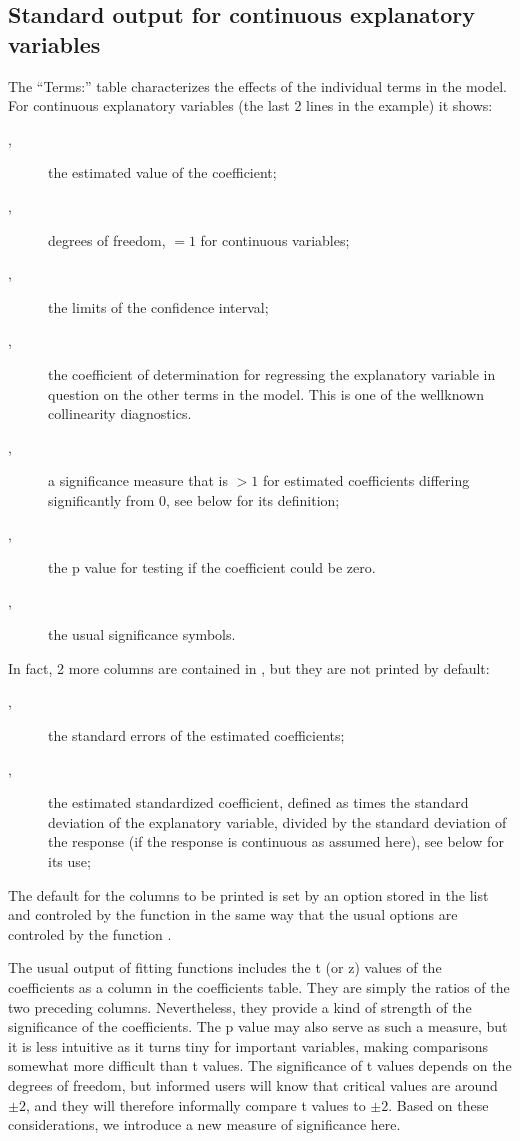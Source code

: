 \documentclass[11pt]{article}
\begin{document}
\subsection{Standard output for continuous explanatory variables}
The ``Terms:'' table characterizes the effects of the individual terms in
the model. For continuous explanatory variables (the last 2 lines in the
example) it shows:
\begin{description}
\item[,] the estimated value of the coefficient;
\item[,] degrees of freedom, $=1$ for continuous variables;
\item[,] the limits of the confidence interval;
\item[,] the coefficient of determination for regressing 
  the explanatory variable in question on the other terms in the model.
  This is one of the wellknown collinearity diagnostics.
\item[,] a significance measure that is $>1$ for estimated
  coefficients differing significantly from 0, see below for its
  definition;
\item[,] the p value for testing if the coefficient could be
  zero. 
\item[,] the usual significance symbols.
\end{description}
In fact, 2 more columns are contained in , but they are
not printed by default:
\begin{description}
\item[,] the standard errors of the estimated coefficients; 
\item[,] the estimated standardized coefficient,
  defined as  times the standard deviation of the explanatory
  variable, divided by the standard deviation of the response (if
  the response is continuous as assumed here), see below for its use;
\end{description}
The default for the columns to be printed is set by an option stored 
in the  list and controled by the function 
 in the same way that the usual options are
controled by the function .

The usual  output of fitting functions includes the 
t (or z) values of the coefficients as a column in the coefficients 
table. 
They are simply the ratios of the two preceding columns. 
Nevertheless, they provide a kind of strength of the significance of the
coefficients. The p value may also serve as such a measure, but it is less 
intuitive as it turns tiny for important variables, making comparisons
somewhat more difficult than t values. 
The significance of t values depends on the degrees of freedom, but
informed users will know that critical values are around $\pm2$, and they will
therefore informally compare t values to $\pm2$. 
Based on these considerations, we introduce a new measure of significance
here. 
\end{document}
